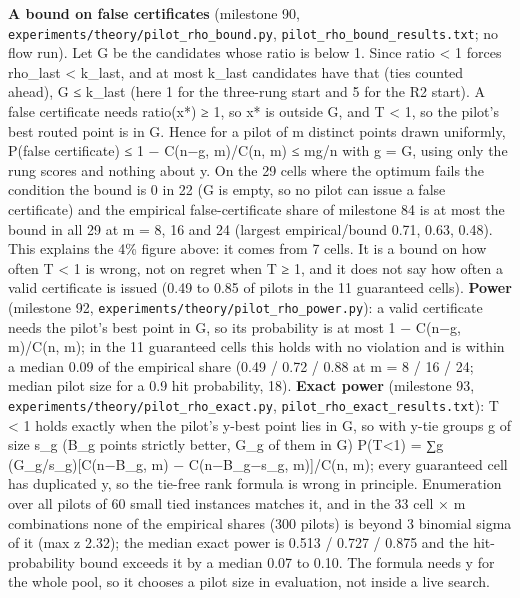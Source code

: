 \documentclass[conference]{IEEEtran}
\begin{document}
\textbf{A bound on false certificates} (milestone 90,
\texttt{experiments/\allowbreak{}theory/\allowbreak{}pilot\_\allowbreak{}rho\_\allowbreak{}bound.py},
\texttt{pilot\_\allowbreak{}rho\_\allowbreak{}bound\_\allowbreak{}results.txt}; no flow run). Let G be the
candidates whose ratio is below 1. Since ratio \textless{} 1 forces
rho\_last \textless{} k\_last, and at most k\_last candidates have that
(ties counted ahead), \textbar G\textbar{} ≤ k\_last (here 1 for the
three-rung start and 5 for the R2 start). A false certificate needs
ratio(x*) ≥ 1, so x* is outside G, and T \textless{} 1, so the pilot's
best routed point is in G. Hence for a pilot of m distinct points drawn
uniformly, P(false certificate) ≤ 1 − C(n−g, m)/C(n, m) ≤ mg/n with g =
\textbar G\textbar, using only the rung scores and nothing about y. On
the 29 cells where the optimum fails the condition the bound is 0 in 22
(G is empty, so no pilot can issue a false certificate) and the
empirical false-certificate share of milestone 84 is at most the bound
in all 29 at m = 8, 16 and 24 (largest empirical/bound 0.71, 0.63,
0.48). This explains the 4\% figure above: it comes from 7 cells. It is
a bound on how often T \textless{} 1 is wrong, not on regret when T ≥ 1,
and it does not say how often a valid certificate is issued (0.49 to
0.85 of pilots in the 11 guaranteed cells). \textbf{Power} (milestone
92, \texttt{experiments/\allowbreak{}theory/\allowbreak{}pilot\_\allowbreak{}rho\_\allowbreak{}power.py}): a valid
certificate needs the pilot's best point in G, so its probability is at
most 1 − C(n−g, m)/C(n, m); in the 11 guaranteed cells this holds with
no violation and is within a median 0.09 of the empirical share (0.49 /
0.72 / 0.88 at m = 8 / 16 / 24; median pilot size for a 0.9 hit
probability, 18). \textbf{Exact power} (milestone 93,
\texttt{experiments/\allowbreak{}theory/\allowbreak{}pilot\_\allowbreak{}rho\_\allowbreak{}exact.py},
\texttt{pilot\_\allowbreak{}rho\_\allowbreak{}exact\_\allowbreak{}results.txt}): T \textless{} 1 holds exactly
when the pilot's y-best point lies in G, so with y-tie groups g of size
s\_g (B\_g points strictly better, G\_g of them in G) P(T\textless1) =
∑g (G\_g/s\_g){[}C(n−B\_g, m) − C(n−B\_g−s\_g, m){]}/C(n, m); every
guaranteed cell has duplicated y, so the tie-free rank formula is wrong
in principle. Enumeration over all pilots of 60 small tied instances
matches it, and in the 33 cell × m combinations none of the empirical
shares (300 pilots) is beyond 3 binomial sigma of it (max
\textbar z\textbar{} 2.32); the median exact power is 0.513 / 0.727 /
0.875 and the hit-probability bound exceeds it by a median 0.07 to 0.10.
The formula needs y for the whole pool, so it chooses a pilot size in
evaluation, not inside a live search.
\end{document}
